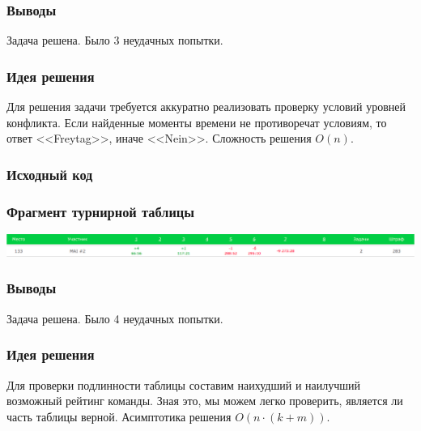 \subsubsection*{Выводы}
Задача решена. Было 3 неудачных попытки.
\pagebreak


\subsubsection*{Идея решения}
Для решения задачи требуется аккуратно реализовать проверку условий уровней конфликта. Если найденные моменты времени не противоречат условиям, то ответ <<Freytag>>, иначе <<Nein>>. Сложность решения $O(n)$.

\subsubsection*{Исходный код}

\subsubsection*{Фрагмент турнирной таблицы}
\includegraphics[width=\textwidth]{images/sib.png}\newline\noindent
\subsubsection*{Выводы}
Задача решена. Было 4 неудачных попытки.
\pagebreak


\subsubsection*{Идея решения}
Для проверки подлинности таблицы составим наихудший и наилучший возможный рейтинг команды. Зная это, мы можем легко проверить, является ли часть таблицы верной. Асимптотика решения $O(n \cdot (k + m))$.

